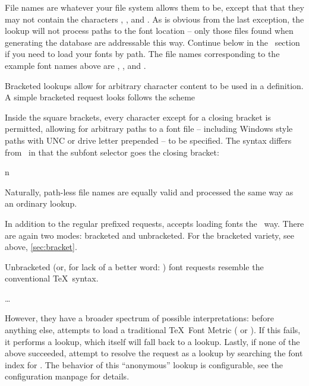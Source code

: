 File names are whatever your file system allows them to be, except
that that they may not contain the characters
  \inlinecode {(},
  \inlinecode {:}, and
  \inlinecode {/}.
%
As is obvious from the last exception, the  lookup will
not process paths to the font location -- only those
files found when generating the database are addressable this way.
%
Continue below in the \XeTeX\ section if you need to load your fonts
by path.
%
The file names corresponding to the example font names above are
  ,
  , and
  .

\endsubsection

\label{sec:bracket}
Bracketed lookups allow for arbitrary character content to be used in a
definition.
%
A simple bracketed request looks follows the scheme

\beginnarrower
  \nonproportional{\string\font\string\fontname\space = [}%
  \nonproportional{]}
\endnarrower

\noindent
Inside the square brackets, every character except for a closing bracket is
permitted, allowing for  arbitrary paths to a font file -- including Windows
style paths with UNC or drive letter prepended -- to be specified.
%
The  syntax differs from \XeTeX\ in that the subfont
selector goes  the closing bracket:

\beginnarrower
  \nonproportional{\string\font\string\fontname\space = [}%
  \nonproportional{]}
  \nonproportional{(}n\nonproportional{)}
\endnarrower

Naturally, path-less file names are equally valid and processed the
same way as an ordinary  lookup.


In addition to the regular prefixed requests, 
accepts loading fonts the \XeTeX\ way.
%
There are again two modes: bracketed and unbracketed.
For the bracketed variety, see above, \ref{sec:bracket}.

Unbracketed (or, for lack of a better word: )
font requests resemble the conventional \TeX\ syntax.

\beginnarrower
  \nonproportional{\string\font\string\fontname\space= }%
  \dots
\endnarrower
\endsubsection

However, they have a broader spectrum of possible interpretations:
before anything else,  attempts to load a
traditional \TeX\ Font Metric ( or ).
%
If this fails, it performs a  lookup, which itself will
fall back to a  lookup.
%
Lastly, if none of the above succeeded, attempt to resolve the request as a
 lookup by searching the font index for .
%
The behavior of this “anonymous” lookup is configurable, see the configuration
manpage for details.

